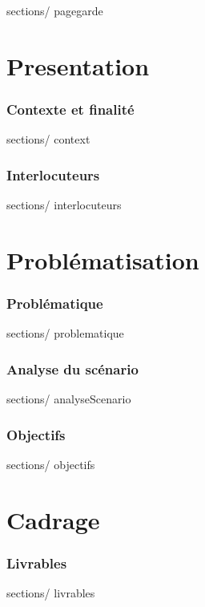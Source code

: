 \documentclass[french, 11pt, a4paper]{article}
\begin{document}
\thispagestyle {plain}

 {sections/} {pagegarde}
\newpage

\tableofcontents
\newpage



\part {Presentation}
\section {Contexte et finalité}
 {sections/} {context}

\newpage
\section {Interlocuteurs}
 {sections/} {interlocuteurs}



\newpage
\part {Problématisation}

\section {Problématique}
 {sections/} {problematique}

\section {Analyse du scénario}
 {sections/} {analyseScenario}

\section {Objectifs}
 {sections/} {objectifs}



\newpage
\part {Cadrage}

\section {Livrables}
 {sections/} {livrables}
\end{document}

